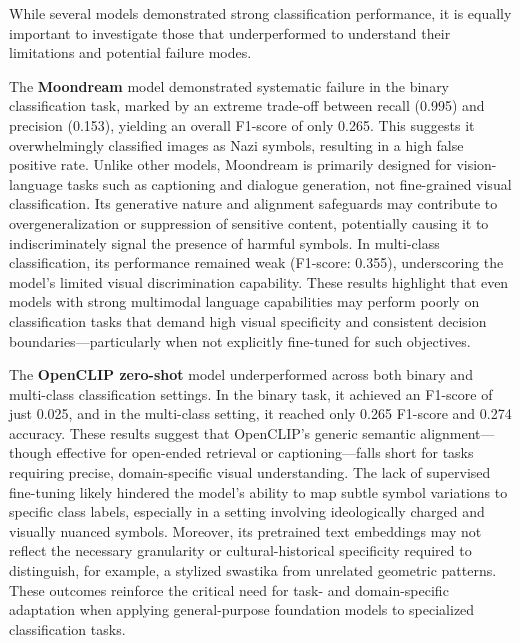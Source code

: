 While several models demonstrated strong classification performance, it is equally important to investigate those
that underperformed to understand their limitations and potential failure modes.

The \textbf{Moondream} model demonstrated systematic failure in the binary classification task, marked by an extreme
trade-off between recall (0.995) and precision (0.153), yielding an overall F1-score of only 0.265. This suggests it
overwhelmingly classified images as Nazi symbols, resulting in a high false positive rate. Unlike other models,
Moondream is primarily designed for vision-language tasks such as captioning and dialogue generation, not
fine-grained visual classification. Its generative nature and alignment safeguards may contribute to
overgeneralization or suppression of sensitive content, potentially causing it to indiscriminately signal the
presence of harmful symbols. In multi-class classification, its performance remained weak (F1-score: 0.355),
underscoring the model’s limited visual discrimination capability. These results highlight that even models with
strong multimodal language capabilities may perform poorly on classification tasks that demand high visual
specificity and consistent decision boundaries—particularly when not explicitly fine-tuned for such objectives.

The \textbf{OpenCLIP zero-shot} model underperformed across both binary and multi-class classification settings. In
the binary task, it achieved an F1-score of just 0.025, and in the multi-class setting, it reached only 0.265
F1-score and 0.274 accuracy. These results suggest that OpenCLIP’s generic semantic alignment—though effective for
open-ended retrieval or captioning—falls short for tasks requiring precise, domain-specific visual understanding.
The lack of supervised fine-tuning likely hindered the model’s ability to map subtle symbol variations to specific
class labels, especially in a setting involving ideologically charged and visually nuanced symbols. Moreover, its
pretrained text embeddings may not reflect the necessary granularity or cultural-historical specificity required to
distinguish, for example, a stylized swastika from unrelated geometric patterns. These outcomes reinforce the
critical need for task- and domain-specific adaptation when applying general-purpose foundation models to
specialized classification tasks.

